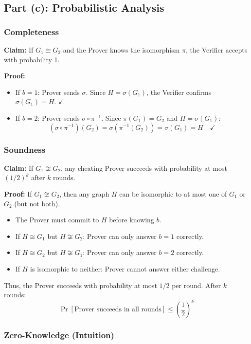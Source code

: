 \documentclass[11pt]{article}
\begin{document}
\subsection{Part (c): Probabilistic Analysis}

\subsubsection{Completeness}
\textbf{Claim:} If $G_1 \cong G_2$ and the Prover knows the isomorphism $\pi$, the Verifier accepts with probability 1.

\textbf{Proof:}
\begin{itemize}
    \item If $b = 1$: Prover sends $\sigma$. Since $H = \sigma(G_1)$, the Verifier confirms $\sigma(G_1) = H$. $\checkmark$
    \item If $b = 2$: Prover sends $\sigma \circ \pi^{-1}$. Since $\pi(G_1) = G_2$ and $H = \sigma(G_1)$:
    \[
    (\sigma \circ \pi^{-1})(G_2) = \sigma(\pi^{-1}(G_2)) = \sigma(G_1) = H \quad \checkmark
    \]
\end{itemize}

\subsubsection{Soundness}
\textbf{Claim:} If $G_1 \not\cong G_2$, any cheating Prover succeeds with probability at most $(1/2)^k$ after $k$ rounds.

\textbf{Proof:} If $G_1 \not\cong G_2$, then any graph $H$ can be isomorphic to at most one of $G_1$ or $G_2$ (but not both).

\begin{itemize}
    \item The Prover must commit to $H$ before knowing $b$.
    \item If $H \cong G_1$ but $H \not\cong G_2$: Prover can only answer $b = 1$ correctly.
    \item If $H \cong G_2$ but $H \not\cong G_1$: Prover can only answer $b = 2$ correctly.
    \item If $H$ is isomorphic to neither: Prover cannot answer either challenge.
\end{itemize}

Thus, the Prover succeeds with probability at most $1/2$ per round. After $k$ rounds:
\[
\Pr[\text{Prover succeeds in all rounds}] \leq \left(\frac{1}{2}\right)^k
\]

\subsubsection{Zero-Knowledge (Intuition)}
\end{document}
